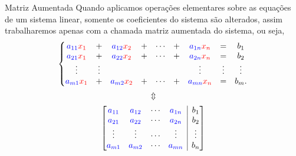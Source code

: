 \begin{frame}[label=sistemas]{Matriz Aumentada}
Quando aplicamos {\color{blue} operações elementares} sobre as equações de um sistema linear, somente os coeficientes do sistema são alterados, assim  trabalharemos apenas com a chamada {\color{blue}matriz aumentada} do sistema, ou seja,
\[
\left\{\begin{matrix}
 {\color{blue}a_{11}}{\color{red}x_1} & + &  {\color{blue}a_{12}}{\color{red}x_2} & + & \cdots & + & {\color{blue}a_{1n}}{\color{red}x_n} & = & b_1  \\
 {\color{blue}a_{21}}{\color{red}x_1} & + & {\color{blue}a_{22}}{\color{red}x_2} & + &   \cdots & + & {\color{blue}a_{2n}}{\color{red}x_n} & = & b_2  \\
\vdots & \vdots  & & & &  & \vdots & \vdots & \vdots  \\
 {\color{blue}a_{m1}}{\color{red}x_1} & + & {\color{blue}a_{m2}}{\color{red}x_2} & + &  \cdots  & + &   {\color{blue}a_{mn}}{\color{red}x_n} & = & b_m. 
\end{matrix}
\right.
\]
\[\Updownarrow \]
\[
\left[\begin{array}{@{}cccc|c@{}}
  {\color{blue}a_{11}}  &  {\color{blue}a_{12}}  & \cdots &  {\color{blue}a_{1n}} & b_1  \\
  {\color{blue}a_{21}} & {\color{blue}a_{22}}  & \cdots  &  {\color{blue}a_{2n}} & b_2\\
 \vdots & \vdots & \cdots & \vdots & \vdots\\
 {\color{blue}a_{m1}} &  {\color{blue}a_{m2}}  & \cdots  &  {\color{blue}a_{mn}} & b_n
\end{array}\right]
\]
\end{frame}



